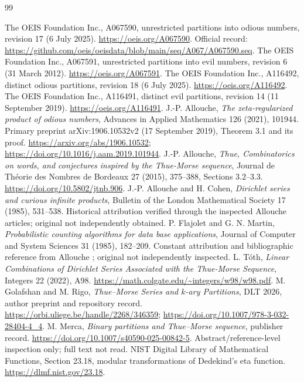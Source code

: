 \documentclass[11pt,letterpaper]{article}
\theoremstyle{remark}\newtheorem{remark}[theorem]{Remark}
\begin{document}
\begin{thebibliography}{99}
\raggedright
{} The OEIS Foundation Inc., A067590, unrestricted partitions into odious numbers, revision 17 (6 July 2025). \url{https://oeis.org/A067590}. Official record: \url{https://github.com/oeis/oeisdata/blob/main/seq/A067/A067590.seq}.
 The OEIS Foundation Inc., A067591, unrestricted partitions into evil numbers, revision 6 (31 March 2012). \url{https://oeis.org/A067591}.
 The OEIS Foundation Inc., A116492, distinct odious partitions, revision 18 (6 July 2025). \url{https://oeis.org/A116492}.
 The OEIS Foundation Inc., A116491, distinct evil partitions, revision 14 (11 September 2019). \url{https://oeis.org/A116491}.
 J.-P. Allouche, \emph{The zeta-regularized product of odious numbers}, Advances in Applied Mathematics 126 (2021), 101944. Primary preprint arXiv:1906.10532v2 (17 September 2019), Theorem 3.1 and its proof. \url{https://arxiv.org/abs/1906.10532}; \url{https://doi.org/10.1016/j.aam.2019.101944}.
 J.-P. Allouche, \emph{Thue, Combinatorics on words, and conjectures inspired by the Thue-Morse sequence}, Journal de Th\'eorie des Nombres de Bordeaux 27 (2015), 375--388, Sections 3.2--3.3. \url{https://doi.org/10.5802/jtnb.906}.
 J.-P. Allouche and H. Cohen, \emph{Dirichlet series and curious infinite products}, Bulletin of the London Mathematical Society 17 (1985), 531--538. Historical attribution verified through the inspected Allouche articles; original not independently obtained.
 P. Flajolet and G. N. Martin, \emph{Probabilistic counting algorithms for data base applications}, Journal of Computer and System Sciences 31 (1985), 182--209. Constant attribution and bibliographic reference from Allouche \cite{allouche2019}; original not independently inspected.
 L. T\'oth, \emph{Linear Combinations of Dirichlet Series Associated with the Thue-Morse Sequence}, Integers 22 (2022), A98. \url{https://math.colgate.edu/~integers/w98/w98.pdf}.
 M. Golafshan and M. Rigo, \emph{Thue--Morse Series and $k$-ary Partitions}, DLT 2026, author preprint and repository record. \url{https://orbi.uliege.be/handle/2268/346359}; \url{https://doi.org/10.1007/978-3-032-28404-4_4}.
 M. Merca, \emph{Binary partitions and Thue--Morse sequence}, publisher record. \url{https://doi.org/10.1007/s40590-025-00842-5}. Abstract/reference-level inspection only; full text not read.
 NIST Digital Library of Mathematical Functions, Section 23.18, modular transformations of Dedekind's eta function. \url{https://dlmf.nist.gov/23.18}.

\end{thebibliography}
\end{document}

